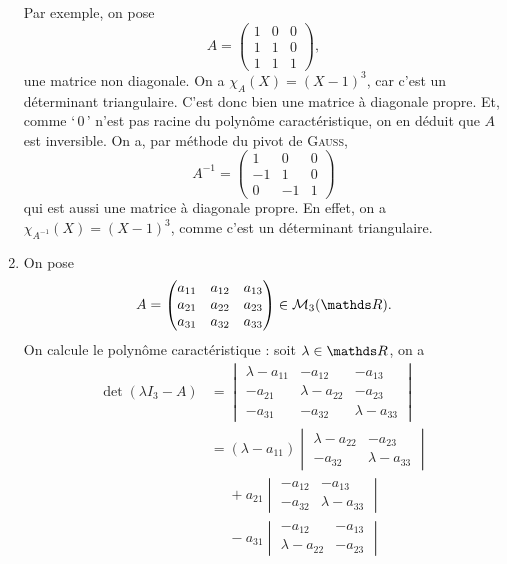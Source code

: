 \documentclass[a4paper]{article}
\begin{document}
\begin{enumerate}
			Par exemple, on pose \[
				A = \begin{pmatrix}
					1&0&0\\
					1&1&0\\
					1&1&1
				\end{pmatrix},
			\]une matrice non diagonale. On a $\chi_A(X) = (X-1)^3$, car c'est un déterminant triangulaire. C'est donc bien une matrice à diagonale propre. Et, comme `\,0\,' n'est pas racine du polynôme caractéristique, on en déduit que $A$\/ est inversible. On a, par méthode du pivot de \textsc{Gauss}, \[
				A^{-1} = \begin{pmatrix}
					1&0&0\\
					-1&1&0\\
					0&-1&1
				\end{pmatrix}
			\] qui est aussi une matrice à diagonale propre. En effet, on a $\chi_{A^{-1}}(X) = (X - 1)^3$, comme c'est un déterminant triangulaire.
		\item On pose \[
				A = \begin{pmatrix}
					a_{11}&a_{12}&a_{13}\\
					a_{21}&a_{22}&a_{23}\\
					a_{31}&a_{32}&a_{33}
				\end{pmatrix} \in \mathcal{M}_3(\R)
			.\] On calcule le polynôme caractéristique : soit $\lambda \in \R$, on a
			\begin{align*}
				\det(\lambda I_3 - A) &=
				\begin{vmatrix}
					\lambda-a_{11}&-a_{12}&-a_{13}\\
					-a_{21}&\lambda-a_{22}&-a_{23}\\
					-a_{31}&-a_{32}&\lambda-a_{33}
				\end{vmatrix}\\
				&= (\lambda - a_{11}) 
				\begin{vmatrix}
					\lambda - a_{22} & -a_{23}\\
					-a_{32}&\lambda-a_{33}
				\end{vmatrix}\\
				&\mathrel{\phantom{=}}{}+ a_{21}
				\begin{vmatrix}
					-a_{12}&-a_{13}\\
					-a_{32}&\lambda-a_{33}
				\end{vmatrix}\\
				&\mathrel{\phantom{=}}{}- a_{31}
				\begin{vmatrix}
					-a_{12} & -a_{13}\\
					\lambda - a_{22} & -a_{23}

\end{vmatrix}
\end{align*}
\end{enumerate}
\end{document}
